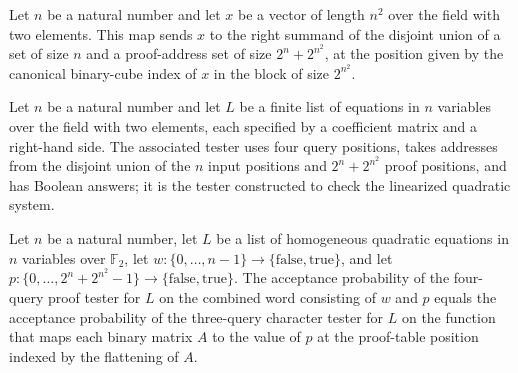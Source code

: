 \begin{definition}
\label{FABL.quadraticMatrixCubeProofAddress}
\leanok
{}
Let $n$ be a natural number and let $x$ be a vector of length $n^2$ over the field with
two elements. This map sends $x$ to the right summand of the disjoint union of a set of
size $n$ and a proof-address set of size $2^n+2^{n^2}$, at the position given by the
canonical binary-cube index of $x$ in the block of size $2^{n^2}$.
\end{definition}

\begin{definition}
\label{FABL.quadraticSystemProofFunctionTester}
\leanok
{}
Let $n$ be a natural number and let $L$ be a finite list of equations in $n$ variables
over the field with two elements, each specified by a coefficient matrix and a
right-hand side. The associated tester uses four query positions, takes addresses from
the disjoint union of the $n$ input positions and $2^n+2^{n^2}$ proof positions, and has
Boolean answers; it is the tester constructed to check the linearized quadratic system.
\end{definition}

\begin{theorem}
\label{FABL.quadraticSystemProofFunctionTester_acceptanceProbability}
\leanok
{}
Let $n$ be a natural number, let $L$ be a list of homogeneous quadratic equations in $n$
variables over $\mathbb F_2$, let
$w:\{0,\ldots,n-1\}\to\{\mathrm{false},\mathrm{true}\}$, and let
$p:\{0,\ldots,2^n+2^{n^2}-1\}\to\{\mathrm{false},\mathrm{true}\}$. The acceptance
probability of the four-query proof tester for $L$ on the combined word consisting of
$w$ and $p$ equals the acceptance probability of the three-query character tester for
$L$ on the function that maps each binary matrix $A$ to the value of $p$ at the
proof-table position indexed by the flattening of $A$.
\end{theorem}

